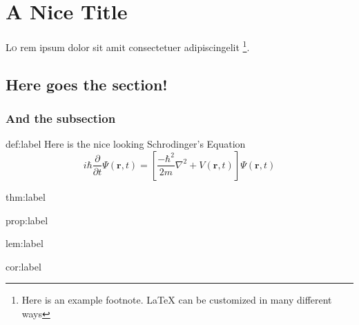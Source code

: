 \documentclass{package/fancy-book}
\begin{document}


\newpage

\tableofcontents

\chapter{A Nice Title}

\lettrine{L}{o} %
rem ipsum dolor sit amit consectetuer adipiscingelit \footnote[1]{Here is an example footnote. \LaTeX{} can be customized in many different ways}.  
\lipsum[1][2-100] \cite{wiki:latex}



\section{Here goes the section!}
\subsection{And the subsection}

\begin{definition}{def:label} %
	\lipsum[1][1-3] %
	Here is the nice looking Schrodinger's Equation \cite{dirac}
	\[i\hbar\frac{\partial}{\partial t} \varPsi(\mathbf{r},t) = \left [ \frac{-\hbar^2}{2m}\nabla^2 + V(\mathbf{r},t)\right ] \varPsi(\mathbf{r},t)\]
\end{definition}

\begin{theorem}{thm:label}%
	\lipsum[2][1-5] %
\end{theorem}

\begin{proposition}{prop:label}%
	\lipsum[4][1-4] %
\end{proposition}

\begin{lemma}{lem:label}%
	\lipsum[3][1-3] %
\end{lemma}

\begin{corollary}{cor:label}%
	\lipsum[5][1-3] %
\end{corollary}
\end{document}
